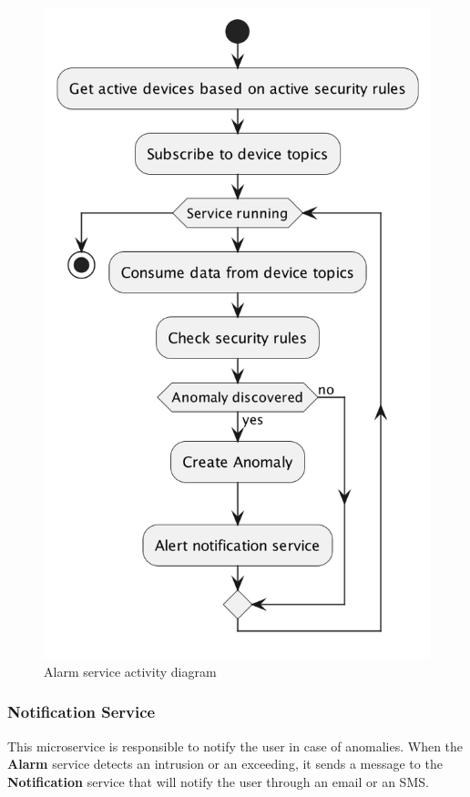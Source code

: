 \documentclass{scrartcl}
\begin{document}
    \begin{figure}
        \centering
        \includegraphics[scale=0.24]{img/alarm-activity}
        \caption{Alarm service activity diagram}
        \label{fig:alarm-activity}
    \end{figure}

    \subsubsection{Notification Service}
    This microservice is responsible to notify the user in case of anomalies.
    When the \textbf{Alarm} service detects an intrusion or an exceeding, it sends a message to the \textbf{Notification}
    service that will notify the user through an email or an SMS\@.
\end{document}
